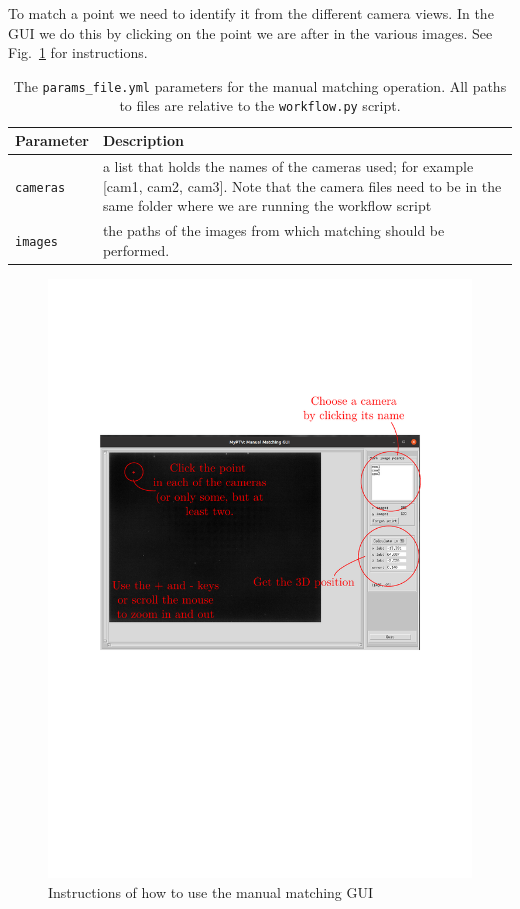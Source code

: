 \documentclass[10pt,a4paper]{article}
\begin{document}
To match a point we need to identify it from the different camera views. In the GUI we do this by clicking on the point we are after in the various images. See Fig.~\ref{fig:man_match} for instructions.

%
\begin{table}[!ht]
	\centering
	\caption{The \texttt{params\_file.yml} parameters for the manual matching operation. All paths to files are relative to the \texttt{workflow.py} script. \label{tab:man_match}}
	\begin{tabular}{l m{10cm}}
		\hline
		Parameter & Description\\[.3em]
		\hline
		\texttt{cameras} & a list that holds the names of the cameras used; for example [cam1, cam2, cam3]. Note that the camera files need to be in the same folder where we are running the workflow script\\[.3em]
		\texttt{images} & the paths of the images from which matching should be performed. \\[.3em]
		\hline
	\end{tabular}
\end{table}



\begin{figure}
	\centering
	\includegraphics[width=12cm]{man_match.pdf}
	\caption{Instructions of how to use the manual matching GUI \label{fig:man_match}}
\end{figure}
\end{document}
